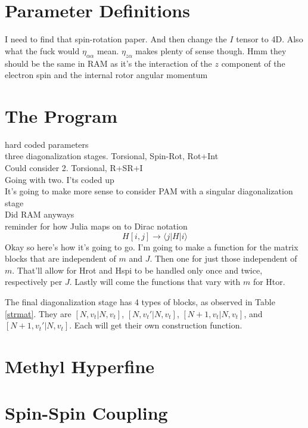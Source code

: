 \documentclass{article}
\begin{document}
\section{Parameter Definitions}
I need to find that spin-rotation paper. And then change the $I$ tensor to 4D. Also what the fuck would $\eta_{\alpha\alpha}$ mean. $\eta_{z\alpha}$ makes plenty of sense though. Hmm they should be the same in RAM as it's the interaction of the $z$ component of the electron spin and the internal rotor angular momentum

\section{The Program}
hard coded parameters \\
three diagonalization stages. Torsional, Spin-Rot, Rot+Int \\
Could consider 2. Torsional, R+SR+I \\
Going with two. I'ts coded up\\
It's going to make more sense to consider PAM with a singular diagonalization stage\\
Did RAM anyways\\
reminder for how Julia maps on to Dirac notation
\begin{equation}
H[i,j] \rightarrow \langle j |H|i\rangle
\end{equation}
Okay so here's how it's going to go. I'm going to make a function for the matrix blocks that are independent of $m$ and $J$. Then one for just those independent of $m$. That'll allow for Hrot and Hspi to be handled only once and twice, respectively per $J$. Lastly will come the functions that vary with $m$ for Htor.\vspace{12pt}

The final diagonalization stage has 4 types of blocks, as observed in Table \ref{strmat}. They are $[N, v_{t}|N, v_{t}]$, $[N, v_{t}'|N, v_{t}]$, $[N+1, v_{t}|N, v_{t}]$, and $[N+1, v_{t}'|N, v_{t}]$. Each will get their own construction function.


\section{Methyl Hyperfine}
\section{Spin-Spin Coupling}
\end{document}
